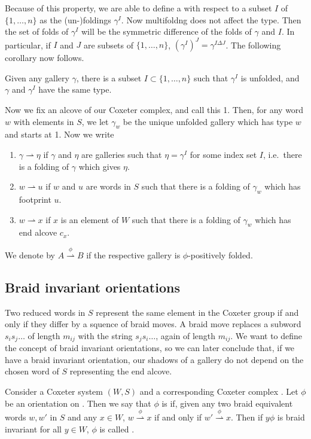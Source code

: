 \documentclass[11pt]{article}
\begin{document}
Because of this property, we are able to define a  with respect to a subset $I$ of $\{1,\hdots ,n\}$ as the (un-)foldings $\gamma^I$. Now multifoldng does not affect the type. Then the set of folds of $\gamma^I$ will be the symmetric difference of the folds of $\gamma$ and $I$. In particular, if $I$ and $J$ are subsets of $\{1,\hdots ,n\}$, $(\gamma^I)^J=\gamma^{I\Delta J}$. The following corollary now follows.

\begin{corollary}
    Given any gallery $\gamma$, there is a subset $I\subset \{1,\hdots ,n\}$ such that $\gamma^I$ is unfolded, and $\gamma$ and $\gamma^I$ have the same type.
\end{corollary}


Now we fix an alcove of our Coxeter complex, and call this 1. Then, for any word $w$ with elements in $S$, we let $\gamma_w$ be the unique unfolded gallery which has type $w$ and starts at 1. Now we write
\begin{enumerate}
    \item $\gamma \rightharpoonup \eta$ if $\gamma$ and $\eta$ are galleries such that $\eta = \gamma^I$ for some index set $I$, i.e.\ there is a folding of $\gamma$ which gives $\eta$.
    \item $w\rightharpoonup u$ if $w$ and $u$ are words in $S$ such that there is a folding of $\gamma_w$ which has footprint $u$.
    \item $w\rightharpoonup x$ if $x$ is an element of $W$ such that there is a folding of $\gamma_w$ which has end alcove $c_x$. 
\end{enumerate}
We denote by $A\stackrel{\phi}{\rightharpoonup} B$ if the respective gallery is $\phi$-positively folded.


\subsection{Braid invariant orientations}

Two reduced words in $S$ represent the same element in the Coxeter group if and only if they differ by a squence of braid moves. A braid move replaces a subword $s_is_j\hdots $ of length $m_{ij}$ with the string $s_js_i\hdots $, again of length $m_{ij}$. We want to define the concept of braid invariant orientations, so we can later conclude that, if we have a braid invariant orientation, our shadows of a gallery do not depend on the chosen word of $S$ representing the end alcove. 

\begin{definition}
    Consider a Coxeter system $(W,S)$ and a corresponding Coxeter complex \sg. Let $\phi$ be an orientation on \sg. Then we say that $\phi$ is  if, given any two braid equivalent words $w,w'$ in $S$ and any $x\in W$, $w\stackrel{\phi}{\rightharpoonup} x$ if and only if $w'\stackrel{\phi}{\rightharpoonup} x$. Then if $y\phi$ is braid invariant for all $y\in W$, $\phi$ is called . 
\end{definition}
\end{document}
